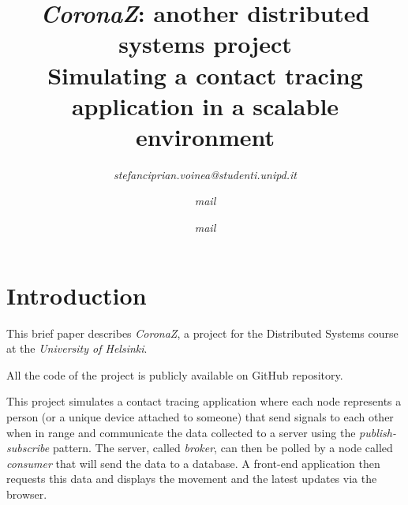 \documentclass[conference]{IEEEtran}
\begin{document}
\title{\textit{CoronaZ}: another distributed systems project
\\{\Large Simulating a contact tracing application in a scalable environment}
}

\author{
	
	\textit{stefanciprian.voinea@studenti.unipd.it}
	\and
	\textit{mail}
	\and
	\textit{mail}
}

\maketitle
\thispagestyle{plain}
\pagestyle{plain}



\section{Introduction}\label{sec:introduction}

	This brief paper describes \textit{CoronaZ}, a project for the Distributed Systems course at the \textit{University of Helsinki}.
	
	All the code of the project is publicly available on GitHub repository\cite{coronaz_repo}.
	
	This project simulates a contact tracing application where each node represents a person (or a unique device attached to someone) that send signals to each other when in range and communicate the data collected to a server using the \textit{publish-subscribe} pattern.
	The server, called \textit{broker}, can then be polled by a node called \textit{consumer} that will send the data to a database.
	A front-end application then requests this data and displays the movement and the latest updates via the browser.
	
\end{document}
